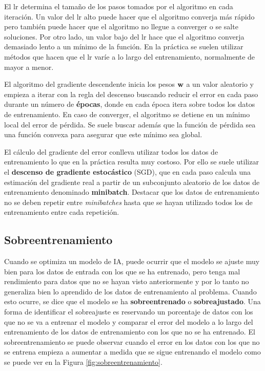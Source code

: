 El lr determina el tamaño de los pasos tomados por el algoritmo en cada iteración. Un valor del lr alto puede hacer que	el algoritmo converja más rápido pero también puede hacer que el algoritmo no llegue a converger o se salte soluciones. Por otro lado, un valor bajo del lr hace que el algoritmo converja demasiado lento a un mínimo de la función. En la práctica se suelen utilizar métodos que hacen que el lr varíe a lo largo del entrenamiento, normalmente de mayor a menor.

El algoritmo del gradiente descendente inicia los pesos $\textnormal{\textbf{w}}$ a un valor aleatorio y empieza a iterar con la regla del descenso buscando reducir el error en cada paso durante un número de \textbf{épocas}, donde en cada época itera sobre todos los datos de entrenamiento. En caso de converger, el algoritmo se detiene en un mínimo local del error de pérdida. Se suele buscar además que la función de pérdida sea una función convexa para asegurar que este mínimo sea global. 

El cálculo del gradiente del error conlleva utilizar todos los datos de entrenamiento lo que en la práctica resulta muy costoso. Por ello se suele utilizar el \textbf{descenso de gradiente estocástico} (SGD), que en cada paso calcula una estimación del gradiente real a partir de un subconjunto aleatorio de los datos de entrenamiento denominado \textbf{minibatch}. Destacar que los datos de entrenamiento no se deben repetir entre \textit{minibatches} hasta que se hayan utilizado todos los de entrenamiento entre cada repetición.

\subsection{Sobreentrenamiento}

Cuando se optimiza un modelo de IA, puede ocurrir que el modelo se ajuste muy bien para los datos de entrada con los que se ha entrenado, pero tenga mal rendimiento para datos que no se hayan visto anteriormente y por lo tanto no generaliza bien lo aprendido de los datos de entrenamiento al problema. Cuando esto ocurre, se dice que el modelo se ha \textbf{sobreentrenado} o \textbf{sobreajustado}. Una forma de identificar el sobreajuste es reservando un porcentaje de datos con los que no se va a entrenar el modelo y comparar el error del modelo a lo largo del entrenamiento de los datos de entrenamiento con los que no se ha entrenado. El sobreentrenamiento se puede observar cuando el error en los datos con los que no se entrena empieza a aumentar a medida que se sigue entrenando el modelo como se puede ver en la Figura \ref{fig:sobreentrenamiento}.


